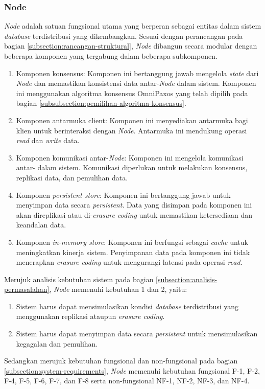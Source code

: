 \subsubsection{Node}
\label{subsubsection:node}

\textit{Node} adalah satuan fungsional utama yang berperan sebagai entitas dalam sistem \textit{database} terdistribusi yang dikembangkan. Sesuai dengan perancangan pada bagian \ref{subsection:rancangan-struktural}, \textit{Node} dibangun secara modular dengan beberapa komponen yang tergabung dalam beberapa subkomponen.

\begin{enumerate}
    \item Komponen konsensus: Komponen ini bertanggung jawab mengelola \textit{state} dari \textit{Node} dan memastikan konsistensi data antar-\textit{Node} dalam sistem. Komponen ini menggunakan algoritma konsensus OmniPaxos yang telah dipilih pada bagian \ref{subsubsection:pemilihan-algoritma-konsensus}.
    \item Komponen antarmuka client: Komponen ini menyediakan antarmuka bagi klien untuk berinteraksi dengan \textit{Node}. Antarmuka ini mendukung operasi \textit{read} dan \textit{write} data.
    \item Komponen komunikasi antar-\textit{Node}: Komponen ini mengelola komunikasi antar- dalam sistem. Komunikasi diperlukan untuk melakukan konsensus, replikasi data, dan pemulihan data.
    \item Komponen \textit{persistent store}: Komponen ini bertanggung jawab untuk menyimpan data secara \textit{persistent}. Data yang disimpan pada komponen ini akan direplikasi atau di-\textit{erasure coding} untuk memastikan ketersediaan dan keandalan data.
    \item Komponen \textit{in-memory store}: Komponen ini berfungsi sebagai \textit{cache} untuk meningkatkan kinerja sistem. Penyimpanan data pada komponen ini tidak menerapkan \textit{erasure coding} untuk mengurangi latensi pada operasi \textit{read}.
\end{enumerate}

Merujuk analisis kebutuhan sistem pada bagian \ref{subsection:analisis-permasalahan}, \textit{Node} memenuhi kebutuhan 1 dan 2, yaitu:

\begin{enumerate}
    \item Sistem harus dapat mensimulasikan kondisi \textit{database} terdistribusi yang menggunakan replikasi ataupun \textit{erasure coding}.
    \item Sistem harus dapat menyimpan data secara \textit{persistent} untuk mensimulasikan kegagalan dan pemulihan.
\end{enumerate}

Sedangkan merujuk kebutuhan fungsional dan non-fungsional pada bagian \ref{subsection:system-requirements}, \textit{Node} memenuhi kebutuhan fungsional F-1, F-2, F-4, F-5, F-6, F-7, dan F-8 serta non-fungsional NF-1, NF-2, NF-3, dan NF-4.
